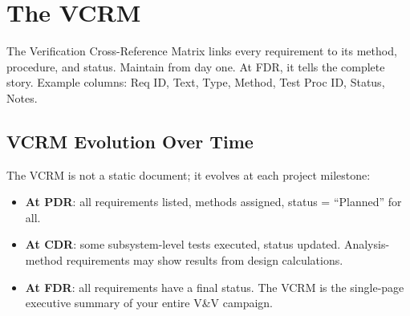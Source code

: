 \section{The VCRM}
The Verification Cross-Reference Matrix links every requirement to its method, procedure, and status. Maintain from day one. At FDR, it tells the complete story. Example columns: Req ID, Text, Type, Method, Test Proc ID, Status, Notes.


\subsection{VCRM Evolution Over Time}
The VCRM is not a static document; it evolves at each project milestone:
\begin{itemize}[nosep,leftmargin=1.5em]
\item \textbf{At PDR}: all requirements listed, methods assigned, status = ``Planned'' for all.
\item \textbf{At CDR}: some subsystem-level tests executed, status updated. Analysis-method requirements may show results from design calculations.
\item \textbf{At FDR}: all requirements have a final status. The VCRM is the single-page executive summary of your entire V\&V campaign.
\end{itemize}


